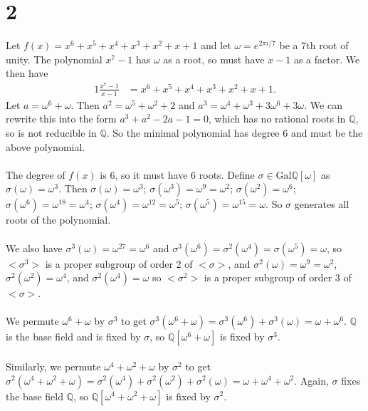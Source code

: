 \documentclass{article}
\begin{document}
\section*{2}

Let $f(x) = x^6 + x^5 + x^4 + x^3 + x^2 + x + 1$ and let $\omega = e^{2 \pi i/7}$ 
be a 7th root of unity.  The polynomial $x^7 - 1$ has $\omega$ as a root, 
so must have $x-1$ as a factor.  We then have 
\begin{alignat*}{1}
  \frac{x^7 - 1}{x - 1} &= x^6 + x^5 + x^4 + x^3 + x^2 + x + 1.
\end{alignat*}
Let $a = \omega^6 + \omega$.  Then $a^2 = \omega^5 + \omega^2 + 2$ and 
$a^3 = \omega^4 + \omega^3 + 3 \omega^6 + 3 \omega$.  We can rewrite this 
into the form $a^3 + a^2 - 2a - 1 = 0$, which has no rational roots in $\mathbb{Q}$, 
so is not reducible in $\mathbb{Q}$.  So the minimal polynomial has degree 6 
and must be the above polynomial.\\
\\ 
The degree of $f(x)$ is 6, so it must have 6 roots.  
Define $\sigma \in \mathrm{Gal}\mathbb{Q}[\omega]$ as $\sigma(\omega) = \omega^3$.  Then 
$\sigma (\omega ) = \omega^3$; $\sigma (\omega^3 ) = \omega^9 = \omega^2$; 
$\sigma (\omega^2 ) = \omega^6$; $\sigma (\omega^6 ) = \omega^{18} = \omega^4$; 
$\sigma (\omega^4 ) = \omega^{12} = \omega^5$; $\sigma (\omega^5 ) = \omega^{15} = \omega$.  
So $\sigma$ generates all roots of the polynomial. \\ 
\\ 
We also have $\sigma^3(\omega) = \omega^{27} = \omega^6$ and 
$\sigma^3(\omega^6) = \sigma^2(\omega^4) = \sigma(\omega^5) = \omega$, so 
$< \sigma^3 >$ is a proper subgroup of order 2 of $< \sigma >$, and 
$\sigma^2(\omega) = \omega^9 = \omega^2$, $\sigma^2(\omega^2) = \omega^4$, 
and $\sigma^2(\omega^4) = \omega$ so $< \sigma^2 >$ is a proper subgroup 
of order 3 of $< \sigma >$. \\ 
\\ 
We permute $\omega^6 + \omega$ by $\sigma^3$ to get $\sigma^3(\omega^6 + \omega) = 
\sigma^3(\omega^6) + \sigma^3(\omega) = \omega + \omega^6$.  $\mathbb{Q}$ is 
the base field and is fixed by $\sigma$, so $\mathbb{Q}[\omega^6 + \omega]$ 
is fixed by $\sigma^3$. \\ 
\\ 
Similarly, we permute $\omega^4 + \omega^2 + \omega$ by $\sigma^2$ to get 
$\sigma^2(\omega^4 + \omega^2 + \omega) = \sigma^2(\omega^4) + 
\sigma^2(\omega^2) + \sigma^2(\omega) = \omega + \omega^4 + \omega^2$.  
Again, $\sigma$ fixes the base field $\mathbb{Q}$, so 
$\mathbb{Q}[ \omega^4 + \omega^2 + \omega]$ is fixed by $\sigma^2$.
\end{document}
